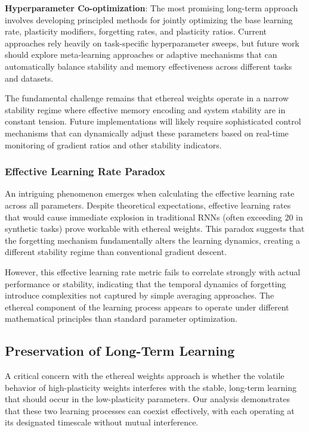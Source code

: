 \documentclass{article} %
\begin{document}
\textbf{Hyperparameter Co-optimization}: The most promising long-term approach involves developing principled methods for jointly optimizing the base learning rate, plasticity modifiers, forgetting rates, and plasticity ratios. Current approaches rely heavily on task-specific hyperparameter sweeps, but future work should explore meta-learning approaches or adaptive mechanisms that can automatically balance stability and memory effectiveness across different tasks and datasets.

The fundamental challenge remains that ethereal weights operate in a narrow stability regime where effective memory encoding and system stability are in constant tension. Future implementations will likely require sophisticated control mechanisms that can dynamically adjust these parameters based on real-time monitoring of gradient ratios and other stability indicators.

\subsubsection{Effective Learning Rate Paradox}

An intriguing phenomenon emerges when calculating the effective learning rate across all parameters. Despite theoretical expectations, effective learning rates that would cause immediate explosion in traditional RNNs (often exceeding 20 in synthetic tasks) prove workable with ethereal weights. This paradox suggests that the forgetting mechanism fundamentally alters the learning dynamics, creating a different stability regime than conventional gradient descent.

However, this effective learning rate metric fails to correlate strongly with actual performance or stability, indicating that the temporal dynamics of forgetting introduce complexities not captured by simple averaging approaches. The ethereal component of the learning process appears to operate under different mathematical principles than standard parameter optimization.

\subsection{Preservation of Long-Term Learning}

A critical concern with the ethereal weights approach is whether the volatile behavior of high-plasticity weights interferes with the stable, long-term learning that should occur in the low-plasticity parameters. Our analysis demonstrates that these two learning processes can coexist effectively, with each operating at its designated timescale without mutual interference.
\end{document}
